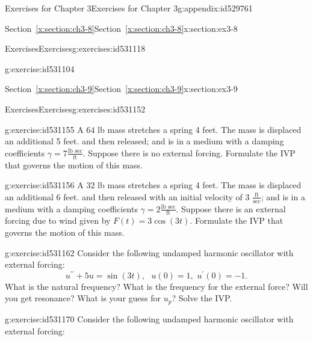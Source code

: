 \documentclass[oneside,10pt,]{book}
\newcommand{\xreffont}{\relax}
\numberwithin{equation}{section}
\numberwithin{equation}{section}
\begin{document}
\begin{appendixptx}{Exercises for Chapter 3}{}{Exercises for Chapter 3}{}{}{g:appendix:id529761}
\begin{sectionptx}{Section~{\xreffont\ref*{x:section:ch3-8}}}{}{Section~{\xreffont\ref*{x:section:ch3-8}}}{}{}{x:section:ex3-8}
\begin{exercises-subsection-numberless}{Exercises}{}{Exercises}{}{}{g:exercises:id531118}
\begin{divisionexercise}{2}{}{}{g:exercise:id531104}
\end{divisionexercise}%
\end{exercises-subsection-numberless}
\end{sectionptx}
%
%
\typeout{************************************************}
\typeout{Section D.7 Section~{\xreffont\ref*{x:section:ch3-9}}}
\typeout{************************************************}
%
\begin{sectionptx}{Section~{\xreffont\ref*{x:section:ch3-9}}}{}{Section~{\xreffont\ref*{x:section:ch3-9}}}{}{}{x:section:ex3-9}
%
%
\typeout{************************************************}
\typeout{************************************************}
%
\begin{exercises-subsection-numberless}{Exercises}{}{Exercises}{}{}{g:exercises:id531152}
\begin{divisionexercise}{1}{}{}{g:exercise:id531155}%
A \(64\) lb mass stretches a spring 4 feet. The mass is displaced an additional 5 feet. and then released; and is in a medium with a damping coefficients \(\gamma=7\frac{\text{lb sec}}{\text{ft}}\). Suppose there is no external forcing. Formulate the IVP that governs the motion of this mass.%
\end{divisionexercise}%
\begin{divisionexercise}{2}{}{}{g:exercise:id531156}%
A \(32\) lb mass stretches a spring 4 feet. The mass is displaced an additional 6 feet. and then released with an initial velocity of 3 \(\frac{\text{ft}}{\text{sec}}\); and is in a medium with a damping coefficients \(\gamma=2\frac{\text{lb sec}}{\text{ft}}\). Suppose there is an external forcing due to wind given by \(F(t)=3\cos\left(3t\right)\). Formulate the IVP that governs the motion of this mass.%
\end{divisionexercise}%
\begin{divisionexercise}{3}{}{}{g:exercise:id531162}%
Consider the following undamped harmonic oscillator with external forcing:%
\begin{equation*}
u^{\prime\prime}+5u=\sin\left(3t\right),\,\,\,\,u(0)=1,\,\,u^{\prime}(0)=-1.
\end{equation*}
What is the natural frequency? What is the frequency for the external force? Will you get resonance? What is your guess for \(u_{p}\)? Solve the IVP.%
\end{divisionexercise}%
\begin{divisionexercise}{4}{}{}{g:exercise:id531170}%
Consider the following undamped harmonic oscillator with external forcing:%

\end{divisionexercise}
\end{exercises-subsection-numberless}
\end{sectionptx}
\end{appendixptx}
\end{document}
